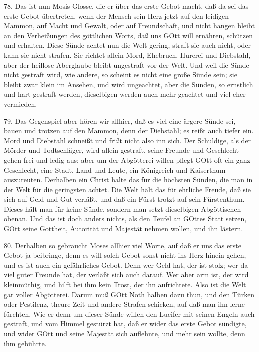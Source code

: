 78. Das ist nun Mosis Glosse, die er über das erste Gebot macht, daß da sei das erste Gebot übertreten, wenn der Mensch sein Herz jetzt auf den leidigen Mammon, auf Macht und Gewalt, oder auf Freundschaft, und nicht hangen bleibt an den Verheißungen des göttlichen Worts, daß uns GOtt will ernähren, schützen und erhalten. Diese Sünde achtet nun die Welt gering, straft sie auch nicht, oder kann sie nicht strafen. Sie richtet allein Mord, Ehebruch, Hurerei und Diebstahl, aber der heillose Aberglaube bleibt ungestraft vor der Welt. Und weil die Sünde nicht gestraft wird, wie andere, so scheint es nicht eine große Sünde sein; sie bleibt zwar klein im Ansehen, und wird ungeachtet, aber die Sünden, so ernstlich und hart gestraft werden, dieselbigen werden auch mehr geachtet und viel eher vermieden.

79. Das Gegenspiel aber hören wir allhier, daß es viel eine ärgere Sünde sei, bauen und trotzen auf den Mammon, denn der Diebstahl; es reißt auch tiefer ein. Mord und Diebstahl schneißt und frißt nicht also inn sich. Der Schuldige, als der Mörder und Todtschläger, wird allein gestraft, seine Freunde und Geschlecht gehen frei und ledig aus; aber um der Abgötterei willen pflegt GOtt oft ein ganz Geschlecht, eine Stadt, Land und Leute, ein Königreich und Kaiserthum auszureuten. Derhalben ein Christ halte das für die höchsten Sünden, die man in der Welt für die geringsten achtet. Die Welt hält das für ehrliche Freude, daß sie sich auf Geld und Gut verläßt, und daß ein Fürst trotzt auf sein Fürstenthum. Dieses hält man für keine Sünde, sondern man setzt dieselbigen Abgöttischen obenan. Und das ist doch anders nichts, als den Teufel an GOttes Statt setzen, GOtt seine Gottheit, Autorität und Majestät nehmen wollen, und ihn lästern.

80. Derhalben so gebraucht Moses allhier viel Worte, auf daß er uns das erste Gebot ja beibringe, denn es will solch Gebot sonst nicht ins Herz hinein gehen, und es ist auch ein gefährliches Gebot. Denn wer Geld hat, der ist stolz; wer da viel guter Freunde hat, der verläßt sich auch darauf. Wer aber arm ist, der wird kleinmüthig, und hilft bei ihm kein Trost, der ihn aufrichtete. Also ist die Welt gar voller Abgötterei. Darum muß GOtt Noth halben dazu thun, und den Türken oder Pestilenz, theure Zeit und andere Strafen schicken, auf daß man ihn lerne fürchten. Wie er denn um dieser Sünde willen den Lucifer mit seinen Engeln auch gestraft, und vom Himmel gestürzt hat, daß er wider das erste Gebot sündigte, und wider GOtt und seine Majestät sich auflehnte, und mehr sein wollte, denn ihm gebührte.

